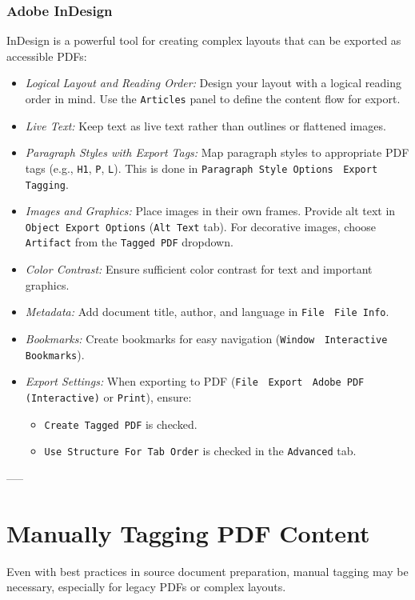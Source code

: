\subsubsection{Adobe InDesign}
\label{subsubsec:indesign}
InDesign is a powerful tool for creating complex layouts that can be exported as accessible PDFs:
\begin{itemize}
\item \emph{Logical Layout and Reading Order:} Design your layout with a logical reading order in mind. Use the \texttt{Articles} panel to define the content flow for export.
\item \emph{Live Text:} Keep text as live text rather than outlines or flattened images.
\item \emph{Paragraph Styles with Export Tags:} Map paragraph styles to appropriate PDF tags (e.g., \texttt{H1}, \texttt{P}, \texttt{L}). This is done in \texttt{Paragraph Style Options} $\>$ \texttt{Export Tagging}.\cite{AdobeInDesignPDF}
\item \emph{Images and Graphics:} Place images in their own frames. Provide alt text in \texttt{Object Export Options} (\texttt{Alt Text} tab). For decorative images, choose \texttt{Artifact} from the \texttt{Tagged PDF} dropdown.
\item \emph{Color Contrast:} Ensure sufficient color contrast for text and important graphics.
\item \emph{Metadata:} Add document title, author, and language in \texttt{File} $\>$ \texttt{File Info}.
\item \emph{Bookmarks:} Create bookmarks for easy navigation (\texttt{Window} $\>$ \texttt{Interactive} $\>$ \texttt{Bookmarks}).
\item \emph{Export Settings:} When exporting to PDF (\texttt{File} $\>$ \texttt{Export} $\>$ \texttt{Adobe PDF (Interactive)} or \texttt{Print}), ensure:
\begin{itemize}
\item \texttt{Create Tagged PDF} is checked.
\item \texttt{Use Structure For Tab Order} is checked in the \texttt{Advanced} tab.
\end{itemize}
\end{itemize}

-----

\section{Manually Tagging PDF Content}
\label{sec:manual-tagging}
Even with best practices in source document preparation, manual tagging may be necessary, especially for legacy PDFs or complex layouts.

